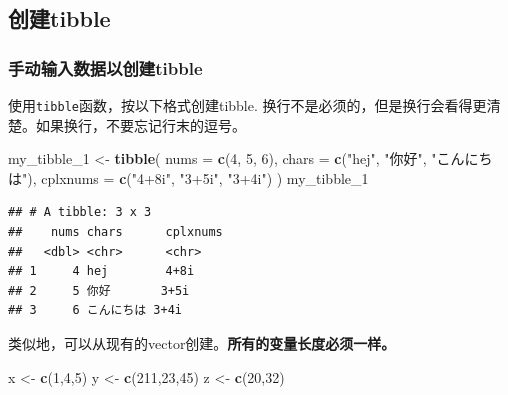 \documentclass[]{book}
\newenvironment{Shaded}{\begin{snugshade}}{\end{snugshade}}
\newcommand{\DataTypeTok}[1]{\textcolor[rgb]{0.13,0.29,0.53}{#1}}
\newcommand{\DecValTok}[1]{\textcolor[rgb]{0.00,0.00,0.81}{#1}}
\newcommand{\KeywordTok}[1]{\textcolor[rgb]{0.13,0.29,0.53}{\textbf{#1}}}
\newcommand{\NormalTok}[1]{#1}
\newcommand{\StringTok}[1]{\textcolor[rgb]{0.31,0.60,0.02}{#1}}
\begin{document}
\hypertarget{tibble}{%
\subsection{创建tibble}\label{tibble}}

\hypertarget{tibble}{%
\subsubsection{手动输入数据以创建tibble}\label{tibble}}

使用\texttt{tibble}函数，按以下格式创建tibble. 换行不是必须的，但是换行会看得更清楚。如果换行，不要忘记行末的逗号。

\begin{Shaded}
\begin{Highlighting}[]
\NormalTok{my_tibble_}\DecValTok{1}\NormalTok{ <-}\StringTok{ }\KeywordTok{tibble}\NormalTok{(}
                \DataTypeTok{nums =} \KeywordTok{c}\NormalTok{(}\DecValTok{4}\NormalTok{, }\DecValTok{5}\NormalTok{, }\DecValTok{6}\NormalTok{),}
                \DataTypeTok{chars =} \KeywordTok{c}\NormalTok{(}\StringTok{"hej"}\NormalTok{, }\StringTok{"你好"}\NormalTok{, }\StringTok{"こんにちは"}\NormalTok{),}
                \DataTypeTok{cplxnums =} \KeywordTok{c}\NormalTok{(}\StringTok{"4+8i"}\NormalTok{, }\StringTok{"3+5i"}\NormalTok{, }\StringTok{"3+4i"}\NormalTok{)}
\NormalTok{                )}
\NormalTok{my_tibble_}\DecValTok{1}
\end{Highlighting}
\end{Shaded}

\begin{verbatim}
## # A tibble: 3 x 3
##    nums chars      cplxnums
##   <dbl> <chr>      <chr>   
## 1     4 hej        4+8i    
## 2     5 你好       3+5i    
## 3     6 こんにちは 3+4i
\end{verbatim}

类似地，可以从现有的vector创建。\textbf{所有的变量长度必须一样。}

\begin{Shaded}
\begin{Highlighting}[]
\NormalTok{x <-}\StringTok{ }\KeywordTok{c}\NormalTok{(}\DecValTok{1}\NormalTok{,}\DecValTok{4}\NormalTok{,}\DecValTok{5}\NormalTok{)}
\NormalTok{y <-}\StringTok{ }\KeywordTok{c}\NormalTok{(}\DecValTok{211}\NormalTok{,}\DecValTok{23}\NormalTok{,}\DecValTok{45}\NormalTok{)}
\NormalTok{z <-}\StringTok{ }\KeywordTok{c}\NormalTok{(}\DecValTok{20}\NormalTok{,}\DecValTok{32}\NormalTok{)}
\end{Highlighting}
\end{Shaded}
\end{document}
